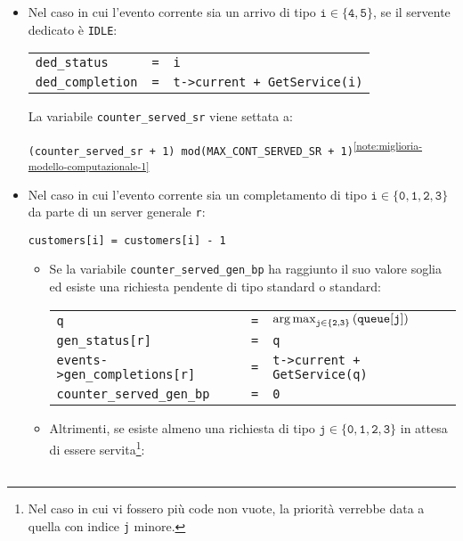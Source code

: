 \begin{enumerate}[label=Step \arabic*), align=left, leftmargin=*]
\begin{itemize}
\item Nel caso in cui l'evento corrente sia un arrivo di tipo $\mathtt{i \in \lbrace 4, 5 \rbrace}$, se il servente dedicato è \texttt{IDLE}:
\begin{center}
\begin{tabular}{l l l}
\texttt{ded\_status} & \texttt{=} & \texttt{i} \\
\texttt{ded\_completion} & \texttt{=} & \texttt{t->current + GetService(i)}
\end{tabular}
\end{center}
{\color{purple}La variabile \texttt{counter\_served\_sr} viene settata a:
\begin{center}
\texttt{(counter\_served\_sr + 1) mod(MAX\_CONT\_SERVED\_SR + 1)}\textsuperscript{\ref{note:miglioria-modello-computazionale-1}}
\end{center}}
\item Nel caso in cui l'evento corrente sia un completamento di tipo $\mathtt{i \in \lbrace 0, 1, 2, 3 \rbrace}$ da parte di un server generale \texttt{r}:
\begin{center}
\texttt{customers[i] = customers[i] - 1}
\end{center}
\begin{itemize}
\item {\color{purple}Se la variabile \texttt{counter\_served\_gen\_bp} ha raggiunto il suo valore soglia ed esiste una richiesta pendente di tipo \uo{} standard o \pp{} standard:
\begin{center}
\begin{tabular}{l l l}
\texttt{q} & \texttt{=} & $\mathtt{\operatorname*{arg\,max}_{j \in \lbrace 2, 3 \rbrace}{\left(queue[j]\right)}}$ \\
\texttt{gen\_status[r]} & \texttt{=} & \texttt{q} \\
\texttt{events->gen\_completions[r]} & \texttt{=} & \texttt{t->current + GetService(q)} \\
\texttt{counter\_served\_gen\_bp} & \texttt{=} & \texttt{0}
\end{tabular}
\end{center}}
\item {\color{purple}Altrimenti,} se esiste almeno una richiesta di tipo $\mathtt{j \in \lbrace 0, 1, 2, 3 \rbrace}$ in attesa di essere servita\footnote{\label{note:miglioria-modello-computazionale-2}Nel caso in cui vi fossero più code non vuote, la priorità verrebbe data a quella con indice \texttt{j} minore.}:
\begin{center}
\begin{tabular}{l l l}

\end{tabular}
\end{center}
\end{itemize}
\end{itemize}
\end{enumerate}
